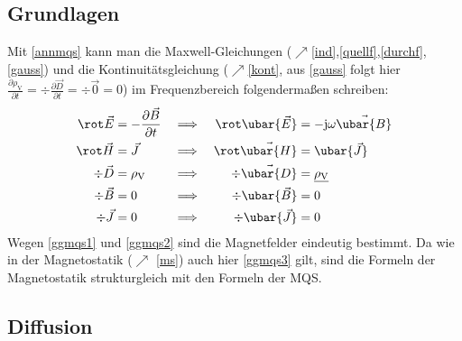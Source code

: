 		\subsection{Grundlagen}
		  Mit \ref{annmqs} kann man die Maxwell-Gleichungen ($\nearrow$\ref{ind},\ref{quellf},\ref{durchf},\ref{gauss}) und die Kontinuitätsgleichung ($\nearrow$\ref{kont}, aus \ref{gauss} folgt hier $\frac{\partial \rho_\text{V}}{\partial t}=\div \frac{\partial \vec{D}}{\partial t}=\div \vec{0}=0$) im Frequenzbereich folgendermaßen schreiben:
		        \begin{align}
			        \rot \vec{E} & = -\frac{\partial \vec{B} }{\partial t} &\implies&& \rot \ubar{\vec{E}} & = -\mathrm{j}\omega \vec{\ubar{B}}\label{ggmqs4} \\
			        \rot \vec{H} & = \vec{J}                               &\implies&& \rot \vec{\ubar{H}} & = \ubar{\vec{J}}               \label{ggmqs1}    \\
			        \div \vec{D} & = \rho_\text{V}                         &\implies&& \div \vec{\ubar{D}} & = \underline{\rho_\text{V}}        \\
			        \div \vec{B} & = 0                                     &\implies&& \div \ubar{\vec{B}} & = 0                               \label{ggmqs2} \\
			        \div \vec{J} & =0                                      &\implies&& \div \ubar{\vec{J}} & =0 \label{ggmqs3}
		        \end{align}
		 Wegen \ref{ggmqs1} und \ref{ggmqs2} sind die Magnetfelder eindeutig bestimmt. Da wie in der Magnetostatik ($\nearrow$ \ref{ms}) auch hier \ref{ggmqs3} gilt, sind die Formeln der Magnetostatik strukturgleich mit den Formeln der MQS.
 \subsection{Diffusion}
